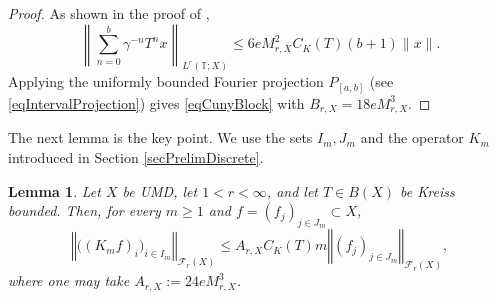\documentclass[12pt]{amsart}
\theoremstyle{plain}
\newtheorem{lemma}[thm]{Lemma}
\theoremstyle{remark}
\theoremstyle{definition}
\newcommand{\T}{\mathbb{T}}
\newcommand{\norm}[1]{\left\Vert #1\right\Vert}
\begin{document}
	\begin{proof}
		As shown in the proof of \cite[Theorem 3.1]{CunyLp},
		\[
		\left\|\sum_{n=0}^b\gamma^{-n}T^nx\right\|_{L^r(\T;X)}
		\le 6eM^2_{r,X}C_K(T)(b+1)\|x\|.
		\]
		Applying the uniformly bounded Fourier projection $P_{[a,b]}$ (see \eqref{eqIntervalProjection}) gives
		\eqref{eqCunyBlock} with $B_{r,X} = 18eM^3_{r,X}$. 
	\end{proof}
	
	The next lemma is the key point. We use the sets $I_m,J_m$ and the operator
	$K_m$ introduced in Section \ref{secPrelimDiscrete}.
	
	\begin{lemma}\label{lemTriangularFourier}
		Let $X$ be UMD, let $1<r<\infty$, and let $T\in B(X)$ be Kreiss bounded.
		Then, for every $m\ge1$ and $f = (f_j)_{j\in J_m} \subset X$,
		\begin{equation}\label{eqTriangularFourier}
			\norm{\bigl((K_mf)_i\bigr)_{i\in I_m}}_{\mathcal F_r(X)}
			\le
			A_{r,X}C_K(T)m
			\norm{(f_j)_{j\in J_m}}_{\mathcal F_r(X)},
		\end{equation}
		where one may take $A_{r,X}:=24eM_{r,X}^3$.
	\end{lemma}
	
\end{document}
